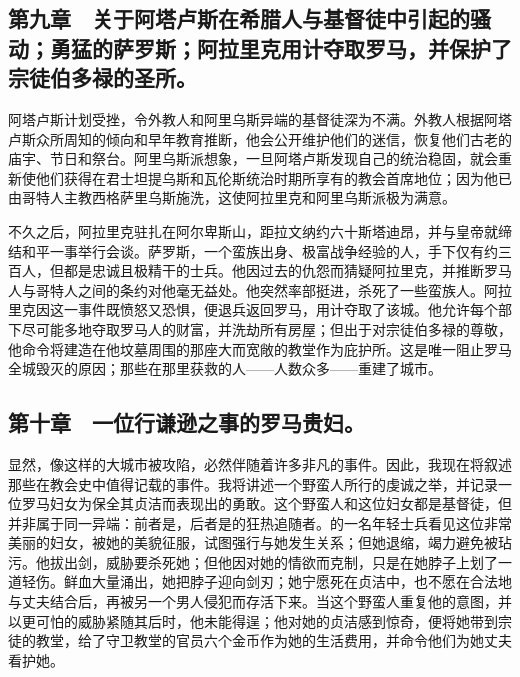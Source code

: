 
\subsection{第九章　关于阿塔卢斯在希腊人与基督徒中引起的骚动；勇猛的萨罗斯；阿拉里克用计夺取罗马，并保护了宗徒伯多禄的圣所。}

阿塔卢斯计划受挫，令外教人和阿里乌斯异端的基督徒深为不满。外教人根据阿塔卢斯众所周知的倾向和早年教育推断，他会公开维护他们的迷信，恢复他们古老的庙宇、节日和祭台。阿里乌斯派想象，一旦阿塔卢斯发现自己的统治稳固，就会重新使他们获得在君士坦提乌斯和瓦伦斯统治时期所享有的教会首席地位；因为他已由哥特人主教西格萨里乌斯施洗，这使阿拉里克和阿里乌斯派极为满意。\par

不久之后，阿拉里克驻扎在阿尔卑斯山，距拉文纳约六十斯塔迪昂，并与皇帝就缔结和平一事举行会谈。萨罗斯，一个蛮族出身、极富战争经验的人，手下仅有约三百人，但都是忠诚且极精干的士兵。他因过去的仇怨而猜疑阿拉里克，并推断罗马人与哥特人之间的条约对他毫无益处。他突然率部挺进，杀死了一些蛮族人。阿拉里克因这一事件既愤怒又恐惧，便退兵返回罗马，用计夺取了该城。他允许每个部下尽可能多地夺取罗马人的财富，并洗劫所有房屋；但出于对宗徒伯多禄的尊敬，他命令将建造在他坟墓周围的那座大而宽敞的教堂作为庇护所。这是唯一阻止罗马全城毁灭的原因；那些在那里获救的人——人数众多——重建了城市。\par


\subsection{第十章　一位行谦逊之事的罗马贵妇。}

显然，像这样的大城市被攻陷，必然伴随着许多非凡的事件。因此，我现在将叙述那些在教会史中值得记载的事件。我将讲述一个野蛮人所行的虔诚之举，并记录一位罗马妇女为保全其贞洁而表现出的勇敢。这个野蛮人和这位妇女都是基督徒，但并非属于同一异端：前者是，后者是的狂热追随者。的一名年轻士兵看见这位非常美丽的妇女，被她的美貌征服，试图强行与她发生关系；但她退缩，竭力避免被玷污。他拔出剑，威胁要杀死她；但他因对她的情欲而克制，只是在她脖子上划了一道轻伤。鲜血大量涌出，她把脖子迎向剑刃；她宁愿死在贞洁中，也不愿在合法地与丈夫结合后，再被另一个男人侵犯而存活下来。当这个野蛮人重复他的意图，并以更可怕的威胁紧随其后时，他未能得逞；他对她的贞洁感到惊奇，便将她带到宗徒的教堂，给了守卫教堂的官员六个金币作为她的生活费用，并命令他们为她丈夫看护她。\par


